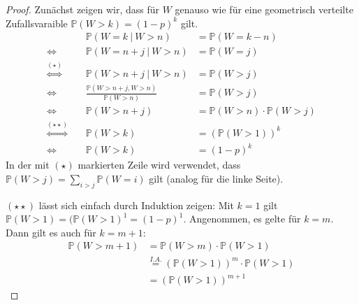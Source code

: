\documentclass[a4paper]{scrartcl}
\newcommand{\gdw}{\Leftrightarrow}
\newcommand{\prob}{\mathbb{P}}
\begin{document}
\begin{enumerate}[label=\bfseries 1.\arabic*]
\begin{proof}
            Zunächst zeigen wir, dass für $W$ genauso wie für eine geometrisch
            verteilte Zufallsvaraible $\prob(W > k) = (1-p)^k$ gilt.
            \begin{equation}
                \begin{alignedat}{2}
                    && \prob(W = k \ |\  W > n) &= \prob(W = k-n) \\
                    \gdw\ && \prob(W = n+j \ |\  W > n) &= \prob(W = j) \\
                    \stackrel{(\star)}{\gdw}\ && 
                    \prob(W > n+j \ |\  W > n) &= \prob(W > j) \\
                    \gdw\ && \frac{\prob(W > n+j,  W > n)}{\prob(W > n)}
                          &= \prob(W > j) \\
                    \gdw\ && \prob(W > n+j)
                          &= \prob(W > n) \cdot \prob(W > j) \\
                    \stackrel{(\star\star)}{\gdw}\ &&
                    \prob(W > k) &= (\prob(W > 1))^k \\
                    \gdw\ && \prob(W > k) &= (1-p)^k
                \end{alignedat}
                \label{eq:memless1}
            \end{equation}
            In der mit $(\star)$ markierten Zeile wird verwendet, dass $\prob(W
            > j) = \sum_{i > j} \prob(W = i)$ gilt (analog für die linke
            Seite).

            $(\star\star)$ lässt sich einfach durch Induktion zeigen: Mit $k=1$
            gilt $\prob(W > 1) = (\prob(W > 1)^1 = (1-p)^1$.  Angenommen, es
            gelte für $k=m$.  Dann gilt es auch für $k=m+1$:
            \begin{equation*}
                \begin{split}
                    \prob(W > m+1)
                    &= \prob(W > m) \cdot \prob(W > 1) \\
                    &\stackrel{I.A.}{=} (\prob(W > 1))^m \cdot \prob(W > 1) \\
                    &= (\prob(W > 1))^{m+1}
                \end{split}
            \end{equation*}


\end{proof}
\end{enumerate}
\end{document}
